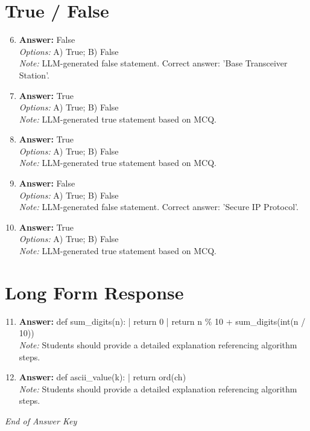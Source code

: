 \documentclass[12pt]{article}
\begin{document}
\section*{True / False}
\begin{enumerate}[label=\arabic*.]
\setcounter{enumi}{5}
\item \textbf{Answer:} False
\\ \textit{Options:} A) True; B) False
\\ \textit{Note:} LLM-generated false statement. Correct answer: 'Base Transceiver Station'.
\item \textbf{Answer:} True
\\ \textit{Options:} A) True; B) False
\\ \textit{Note:} LLM-generated true statement based on MCQ.
\item \textbf{Answer:} True
\\ \textit{Options:} A) True; B) False
\\ \textit{Note:} LLM-generated true statement based on MCQ.
\item \textbf{Answer:} False
\\ \textit{Options:} A) True; B) False
\\ \textit{Note:} LLM-generated false statement. Correct answer: 'Secure IP Protocol'.
\item \textbf{Answer:} True
\\ \textit{Options:} A) True; B) False
\\ \textit{Note:} LLM-generated true statement based on MCQ.
\end{enumerate}

\section*{Long Form Response}
\begin{enumerate}[label=\arabic*.]
\setcounter{enumi}{10}
\item \textbf{Answer:} def sum\_digits(n): | return 0 | return n \% 10 + sum\_digits(int(n / 10))
\\ \textit{Note:} Students should provide a detailed explanation referencing algorithm steps.
\item \textbf{Answer:} def ascii\_value(k): | return ord(ch)
\\ \textit{Note:} Students should provide a detailed explanation referencing algorithm steps.
\end{enumerate}

\vfill
\noindent\textit{End of Answer Key}
\end{document}
